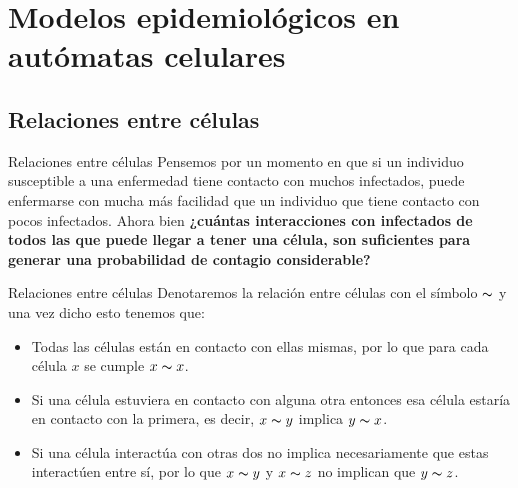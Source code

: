 \documentclass[9pt]{beamer}
\begin{document}
\section{Modelos epidemiológicos en autómatas celulares}
\subsection{Relaciones entre células}
\begin{frame}{Relaciones entre células}
Pensemos por un momento en que si un individuo susceptible a una enfermedad tiene contacto con muchos infectados, puede enfermarse con mucha más facilidad que un individuo que tiene contacto con pocos infectados. Ahora bien \textbf{¿cuántas interacciones con infectados de todos las que puede llegar a tener una célula, son suficientes para generar una probabilidad de contagio considerable?}

\end{frame}

\begin{frame}{Relaciones entre células}
Denotaremos la relación entre células con el símbolo $\thicksim$ y una vez dicho esto tenemos que:

\begin{itemize}
    \item Todas las células están en contacto con ellas mismas, por lo que para cada célula $x$ se cumple $x \thicksim x$.
    \item Si una célula estuviera en contacto con alguna otra entonces esa célula estaría en contacto con la primera, es decir, $x\thicksim y$ implica $y\thicksim x$.
    \item Si una célula interactúa con otras dos no implica necesariamente que estas interactúen entre sí, por lo que $x\thicksim y$ y $x\thicksim z$ no implican que $y\thicksim z$.
\end{itemize}
\end{frame}
\end{document}

